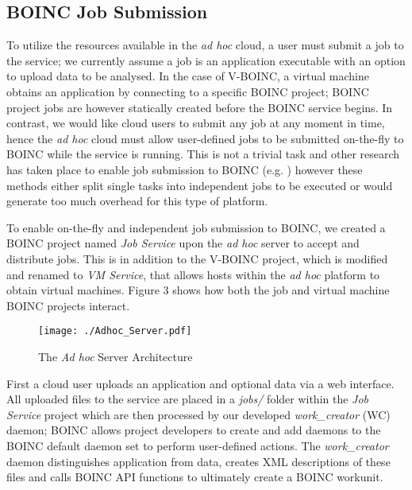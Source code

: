 \documentclass[10pt, conference, compsocconf]{IEEEtran}
\begin{document}
\subsection{BOINC Job Submission}
To utilize the resources available in the \textit{ad hoc} cloud, a user must submit a job to the service; we currently assume a job is an application executable with an option to upload data to be analysed. In the case of V-BOINC, a virtual machine obtains an application by connecting to a specific BOINC project; BOINC project jobs are however statically created before the BOINC service begins. In contrast, we would like cloud users to submit any job at any moment in time, hence the \textit{ad hoc} cloud must allow user-defined jobs to be submitted on-the-fly to BOINC while the service is running. This is not a trivial task and other research has taken place to enable job submission to BOINC (e.g. \cite{Rios2011,Urbah2009,Kertesz2010}) however these methods either split single tasks into independent jobs to be executed or would generate too much overhead for this type of platform.

To enable on-the-fly and independent job submission to BOINC, we created a BOINC project named \textit{Job Service} upon the \textit{ad hoc} server to accept and distribute jobs. This is in addition to the V-BOINC project, which is modified and renamed to \textit{VM Service}, that allows hosts within the \textit{ad hoc} platform to obtain virtual machines. Figure 3 shows how both the job and virtual machine BOINC projects interact.

\begin{figure}[h!]
  \begin{center}
\texttt{[image: ./Adhoc\_Server.pdf]}
  \end{center}
 \caption{The \textit{Ad hoc} Server Architecture}
\end{figure}

\noindent First a cloud user uploads an application and optional data via a web interface. All uploaded files to the service are placed in a \textit{jobs/} folder within the \textit{Job Service} project which are then processed by our developed \textit{work\_creator} (WC) daemon; BOINC allows project developers to create and add daemons to the BOINC default daemon set to perform user-defined actions. The \textit{work\_creator} daemon distinguishes application from data, creates XML descriptions of these files and calls BOINC API functions to ultimately create a BOINC workunit.
\end{document}

